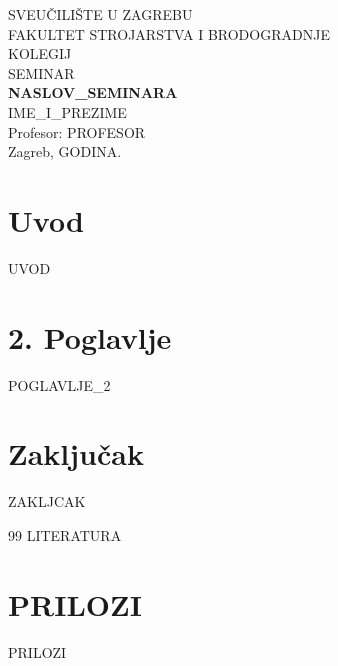 \documentclass[12pt,a4paper]{article}
\begin{document}
\begin{titlepage}
    \centering
    {\large SVEUČILIŠTE U ZAGREBU\\}
    {\large FAKULTET STROJARSTVA I BRODOGRADNJE\\}
    \vspace{2.5cm}
    {\Large {{KOLEGIJ}}\\}
    \vspace{0.5cm}
    {\Large SEMINAR\\}
    \vspace{1.5cm}
    {\Huge \textbf{{{NASLOV_SEMINARA}}}\\}
    \vspace{1.5cm}
    {\large {{IME_I_PREZIME}}\\}
    \vfill
    {\large Profesor: {{PROFESOR}}\\}
    \vspace{1cm}
    {\large Zagreb, {{GODINA}}.}
\end{titlepage}


\tableofcontents
\newpage
\listoffigures
\newpage
\listoftables
\newpage


\section{Uvod}
{{UVOD}}

\section{2. Poglavlje}
{{POGLAVLJE_2}}

\section{Zaključak}
{{ZAKLJCAK}}

\newpage
\begin{thebibliography}{99}
{{LITERATURA}}
\end{thebibliography}

\appendix
\section{PRILOZI}
{{PRILOZI}}
\end{document}
